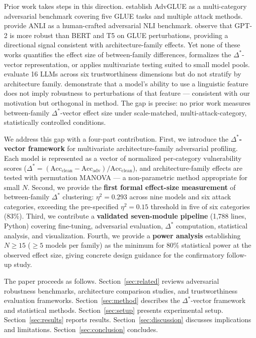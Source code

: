 Prior work takes steps in this direction. \citet{Wang2021Adversarial} establish AdvGLUE as a
multi-category adversarial benchmark covering five GLUE tasks and multiple attack methods.
\citet{Nie2020Adversarial} provide ANLI as a human-crafted adversarial NLI benchmark.
\citet{Neerudu2023Robustness} observe that GPT-2 is more robust than BERT and T5 on GLUE
perturbations, providing a directional signal consistent with architecture-family effects. Yet none
of these works quantifies the effect size of between-family differences, formalizes the
$\Delta^*$-vector representation, or applies multivariate testing suited to small model pools.
\citet{Sun2024TrustLLM} evaluate 16 LLMs across six trustworthiness dimensions but do not
stratify by architecture family. \citet{Otmakhova2025FLUKE} demonstrate that a model's ability
to use a linguistic feature does not imply robustness to perturbations of that feature ---
consistent with our motivation but orthogonal in method. The gap is precise: no prior work
measures between-family $\Delta^*$-vector effect size under scale-matched, multi-attack-category,
statistically controlled conditions.

We address this gap with a four-part contribution. First, we introduce the \textbf{$\Delta^*$-vector
framework} for multivariate architecture-family adversarial profiling. Each model is represented
as a vector of normalized per-category vulnerability scores
($\Delta^* = (\text{Acc}_\text{clean} - \text{Acc}_\text{adv})/\text{Acc}_\text{clean}$), and
architecture-family effects are tested with permutation MANOVA --- a non-parametric method
appropriate for small $N$. Second, we provide the \textbf{first formal effect-size measurement}
of between-family $\Delta^*$ clustering: $\eta^2=0.293$ across nine models and six attack
categories, exceeding the pre-specified $\eta^2=0.15$ threshold in five of six categories (83\%).
Third, we contribute a \textbf{validated seven-module pipeline} (1,788 lines, Python) covering
fine-tuning, adversarial evaluation, $\Delta^*$ computation, statistical analysis, and
visualization. Fourth, we provide a \textbf{power analysis} establishing $N \geq 15$ ($\geq 5$
models per family) as the minimum for 80\% statistical power at the observed effect size, giving
concrete design guidance for the confirmatory follow-up study.

The paper proceeds as follows. Section~\ref{sec:related} reviews adversarial robustness benchmarks,
architecture comparison studies, and trustworthiness evaluation frameworks. Section~\ref{sec:method}
describes the $\Delta^*$-vector framework and statistical methods. Section~\ref{sec:setup} presents
experimental setup. Section~\ref{sec:results} reports results. Section~\ref{sec:discussion} discusses
implications and limitations. Section~\ref{sec:conclusion} concludes.
